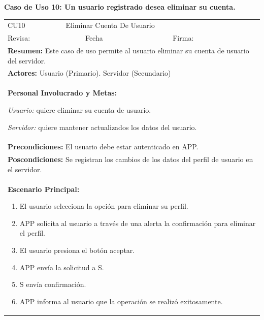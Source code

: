 		\textbf{Caso de Uso 10: Un usuario registrado desea eliminar su cuenta.}
			\begin{longtable}{|l|p{5.5cm}|l|p{2cm}|l|p{1.9cm}|} \hline
					\cellcolor{grisOscuro} CU10 & \multicolumn{4}{|l|}{  \cellcolor{grisOscuro} Eliminar Cuenta De Usuario} &  \cellcolor{grisClaro}\multirow{2}{1cm}{} \\ \cline{1-5}
					\cellcolor{grisOscuro} Revisa: &  \cellcolor{grisClaro} &  \cellcolor{grisOscuro} Fecha &  \cellcolor{grisClaro} &  \cellcolor{grisOscuro} Firma: & \cellcolor{grisClaro} \\ \hline
					\multicolumn{6}{|p{15cm}|}{ \textbf{Resumen: } Este caso de uso permite al usuario eliminar su cuenta de usuario del servidor.

					} \\ \hline

					\multicolumn{6}{|p{15cm}|}{ \textbf{Actores: } Usuario (Primario). Servidor (Secundario)

					} \\ \hline

					\multicolumn{6}{|p{15cm}|}{ \textbf{Personal Involucrado y Metas: }
					
					\emph{Usuario:} quiere eliminar su cuenta de usuario.

					\emph{Servidor:} quiere mantener actualizados los datos del usuario.

					} \\ \hline

					\multicolumn{6}{|p{15cm}|}{ \textbf{Precondiciones: } El usuario debe estar autenticado en APP.

					} \\ \hline

					\multicolumn{6}{|p{15cm}|}{ \textbf{Poscondiciones: } Se registran los cambios de los datos del perfil de usuario en el servidor.

					} \\ \hline

					\multicolumn{6}{|p{15cm}|}{ \textbf{Escenario Principal: }

					\begin{enumerate}
							\item El usuario selecciona la opción para eliminar su perfil.
							\item APP solicita al usuario a través de una alerta la confirmación para eliminar el perfil.
							\item El usuario presiona el botón aceptar.
							\item APP envía la solicitud a S.
							\item S envía confirmación.
							\item APP informa al usuario que la operación se realizó exitosamente.
					\end{enumerate}

}
\end{longtable}
